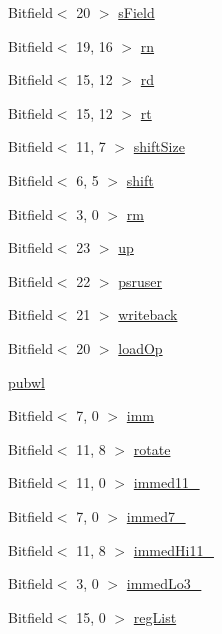 \begin{DoxyCompactItemize}
\item 
Bitfield$<$ 20 $>$ \hyperlink{namespaceArmISA_ade0fac2a6e941f8aca98d53405c96a80}{sField}
\item 
Bitfield$<$ 19, 16 $>$ \hyperlink{namespaceArmISA_adf8c6c579ad8729095a637a4f2181211}{rn}
\item 
Bitfield$<$ 15, 12 $>$ \hyperlink{namespaceArmISA_a7108a0a03f819a683bb745ab6e02179d}{rd}
\item 
Bitfield$<$ 15, 12 $>$ \hyperlink{namespaceArmISA_a445689c4b952c722ae5b0cec0311cd10}{rt}
\item 
Bitfield$<$ 11, 7 $>$ \hyperlink{namespaceArmISA_a4ccee026db422a255c79f00dde76163d}{shiftSize}
\item 
Bitfield$<$ 6, 5 $>$ \hyperlink{namespaceArmISA_a6d82125bd21b3128b8081781fa6a34a3}{shift}
\item 
Bitfield$<$ 3, 0 $>$ \hyperlink{namespaceArmISA_ad546c2cf2168cf2d8ac21b2a9f485e82}{rm}
\item 
Bitfield$<$ 23 $>$ \hyperlink{namespaceArmISA_a3a82fdc0669ddcc0c196b1ac0220c55a}{up}
\item 
Bitfield$<$ 22 $>$ \hyperlink{namespaceArmISA_a020f6beec91f9bde9ad42c457e89a6a5}{psruser}
\item 
Bitfield$<$ 21 $>$ \hyperlink{namespaceArmISA_a8143fa40e9030da2e8b93ba9990a7bb1}{writeback}
\item 
Bitfield$<$ 20 $>$ \hyperlink{namespaceArmISA_a7b7076d85af3608eb9960edfcf8c2e74}{loadOp}
\item 
\hyperlink{namespaceArmISA_af5f0c8adaad10e34b80f2422c95eb3ac}{pubwl}
\item 
Bitfield$<$ 7, 0 $>$ \hyperlink{namespaceArmISA_a2308526fcc9af84548a72f9ba3102ec1}{imm}
\item 
Bitfield$<$ 11, 8 $>$ \hyperlink{namespaceArmISA_a0336ec5a3da687cb30a35704a4546128}{rotate}
\item 
Bitfield$<$ 11, 0 $>$ \hyperlink{namespaceArmISA_a20b35638ba4e068159f3e3d3b42ac9cb}{immed11\_}
\item 
Bitfield$<$ 7, 0 $>$ \hyperlink{namespaceArmISA_a287bee9c6c2c9b82373062ed23edb857}{immed7\_}
\item 
Bitfield$<$ 11, 8 $>$ \hyperlink{namespaceArmISA_a7db5dae850bf4b5e9a7898698c5abf17}{immedHi11\_}
\item 
Bitfield$<$ 3, 0 $>$ \hyperlink{namespaceArmISA_a44f58e0d347621dde66963883bd1a6d9}{immedLo3\_}
\item 
Bitfield$<$ 15, 0 $>$ \hyperlink{namespaceArmISA_a8799515ed52fb55ba27a58e94960d048}{regList}

\end{DoxyCompactItemize}
